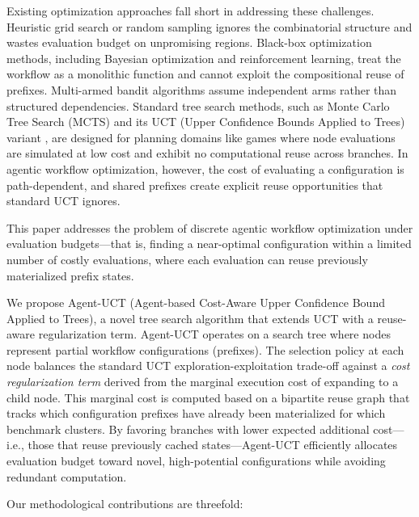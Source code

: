\documentclass{article}
\begin{document}
    Existing optimization approaches fall short in addressing these challenges. Heuristic grid search or random sampling ignores the combinatorial structure and wastes evaluation budget on unpromising regions. Black-box optimization methods, including Bayesian optimization and reinforcement learning, treat the workflow as a monolithic function and cannot exploit the compositional reuse of prefixes. Multi-armed bandit algorithms assume independent arms rather than structured dependencies. Standard tree search methods, such as Monte Carlo Tree Search (MCTS) and its UCT (Upper Confidence Bounds Applied to Trees) variant \citep{kocsis2006bandit, coquelin2007bandit}, are designed for planning domains like games where node evaluations are simulated at low cost and exhibit no computational reuse across branches. In agentic workflow optimization, however, the cost of evaluating a configuration is path-dependent, and shared prefixes create explicit reuse opportunities that standard UCT ignores.

    This paper addresses the problem of discrete agentic workflow optimization under evaluation budgets—that is, finding a near-optimal configuration within a limited number of costly evaluations, where each evaluation can reuse previously materialized prefix states.

    We propose Agent-UCT (Agent-based Cost-Aware Upper Confidence Bound Applied to Trees), a novel tree search algorithm that extends UCT with a reuse-aware regularization term. Agent-UCT operates on a search tree where nodes represent partial workflow configurations (prefixes). The selection policy at each node balances the standard UCT exploration-exploitation trade-off against a \textit{cost regularization term} derived from the marginal execution cost of expanding to a child node. This marginal cost is computed based on a bipartite reuse graph that tracks which configuration prefixes have already been materialized for which benchmark clusters. By favoring branches with lower expected additional cost—i.e., those that reuse previously cached states—Agent-UCT efficiently allocates evaluation budget toward novel, high-potential configurations while avoiding redundant computation.

Our methodological contributions are threefold:
\end{document}
